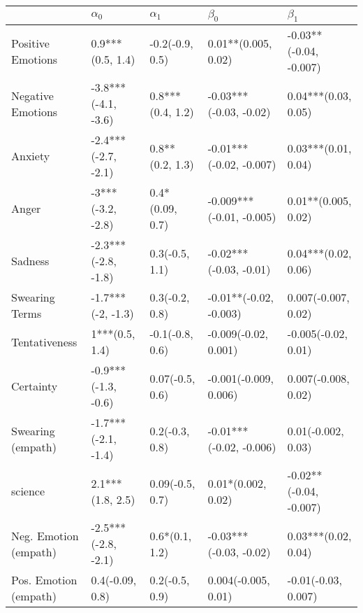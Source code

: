 \begin{tabular}{lllll}
\toprule
{} &           $\alpha_0$ &        $\alpha_1$ &                 $\beta_0$ &               $\beta_1$ \\
\midrule
Positive Emotions     &     0.9***(0.5, 1.4) &   -0.2(-0.9, 0.5) &       0.01**(0.005, 0.02) &  -0.03**(-0.04, -0.007) \\
Negative Emotions     &  -3.8***(-4.1, -3.6) &  0.8***(0.4, 1.2) &    -0.03***(-0.03, -0.02) &     0.04***(0.03, 0.05) \\
Anxiety               &  -2.4***(-2.7, -2.1) &   0.8**(0.2, 1.3) &   -0.01***(-0.02, -0.007) &     0.03***(0.01, 0.04) \\
Anger                 &    -3***(-3.2, -2.8) &   0.4*(0.09, 0.7) &  -0.009***(-0.01, -0.005) &     0.01**(0.005, 0.02) \\
Sadness               &  -2.3***(-2.8, -1.8) &    0.3(-0.5, 1.1) &    -0.02***(-0.03, -0.01) &     0.04***(0.02, 0.06) \\
Swearing Terms        &    -1.7***(-2, -1.3) &    0.3(-0.2, 0.8) &    -0.01**(-0.02, -0.003) &     0.007(-0.007, 0.02) \\
Tentativeness         &       1***(0.5, 1.4) &   -0.1(-0.8, 0.6) &      -0.009(-0.02, 0.001) &     -0.005(-0.02, 0.01) \\
Certainty             &  -0.9***(-1.3, -0.6) &   0.07(-0.5, 0.6) &     -0.001(-0.009, 0.006) &     0.007(-0.008, 0.02) \\
Swearing (empath)     &  -1.7***(-2.1, -1.4) &    0.2(-0.3, 0.8) &   -0.01***(-0.02, -0.006) &      0.01(-0.002, 0.03) \\
science               &     2.1***(1.8, 2.5) &   0.09(-0.5, 0.7) &        0.01*(0.002, 0.02) &  -0.02**(-0.04, -0.007) \\
Neg. Emotion (empath) &  -2.5***(-2.8, -2.1) &    0.6*(0.1, 1.2) &    -0.03***(-0.03, -0.02) &     0.03***(0.02, 0.04) \\
Pos. Emotion (empath) &      0.4(-0.09, 0.8) &    0.2(-0.5, 0.9) &       0.004(-0.005, 0.01) &     -0.01(-0.03, 0.007) \\
\bottomrule
\end{tabular}
